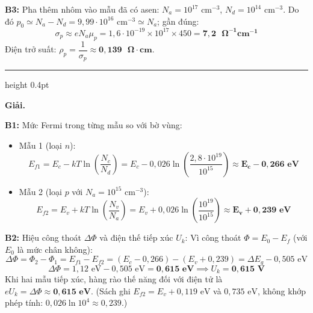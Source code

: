 \documentclass[11pt,a4paper]{article}
\renewcommand{\boldsymbol}[1]{\symbf{#1}}
\let\DeBaiOriginal\DeBai
\renewcommand{\DeBai}[1]{\par\Needspace{5\baselineskip}\DeBaiOriginal{#1}}
\newcommand{\PhanCachBai}{%
  \par\Needspace{7\baselineskip}%
  \addvspace{6pt}%
  {\color{black!40}\hrule height 0.4pt}%
  \nobreak\vspace{7pt}\nobreak
}
\begin{document}
\textbf{B3:} Pha thêm nhôm vào mẫu đã có asen: $N_a=10^{17}\text{ cm}^{-3}$, $N_d=10^{14}\text{ cm}^{-3}$. Do đó $p_0\simeq N_a-N_d=9{,}99\cdot10^{16}\text{ cm}^{-3}\simeq N_a$; gần đúng:
\begin{equation*}
    \sigma_p \approx e N_a \mu_p = 1{,}6 \cdot 10^{-19} \times 10^{17} \times 450 = \boldsymbol{7{,}2\text{ }\Omega^{-1}\text{cm}^{-1}}
\end{equation*}
Điện trở suất: $\rho_p = \dfrac{1}{\sigma_p} \approx \boldsymbol{0{,}139\text{ }\Omega\cdot\text{cm}}$.

\PhanCachBai


\textbf{Giải.}

\textbf{B1:} Mức Fermi trong từng mẫu so với bờ vùng:
\begin{itemize}[leftmargin=*, topsep=1pt, itemsep=1pt]
  \item Mẫu 1 (loại $n$):
  \begin{equation*}
      E_{f1} = E_c - kT \ln\left(\frac{N_c}{N_d}\right) = E_c - 0{,}026 \ln\left(\frac{2{,}8 \cdot 10^{19}}{10^{15}}\right) \approx \boldsymbol{E_c - 0{,}266\text{ eV}}
  \end{equation*}
  \item Mẫu 2 (loại $p$ với $N_a = 10^{15}\text{ cm}^{-3}$):
  \begin{equation*}
      E_{f2} = E_v + kT \ln\left(\frac{N_v}{N_a}\right) = E_v + 0{,}026 \ln\left(\frac{10^{19}}{10^{15}}\right) \approx \boldsymbol{E_v + 0{,}239\text{ eV}}
  \end{equation*}
\end{itemize}

\textbf{B2:} Hiệu công thoát $\Delta\Phi$ và điện thế tiếp xúc $U_k$:
Vì công thoát $\Phi = E_0 - E_f$ (với $E_0$ là mức chân không):
\begin{equation*}
    \Delta\Phi = \Phi_2 - \Phi_1 = E_{f1} - E_{f2} = (E_c - 0{,}266) - (E_v + 0{,}239) = \Delta E_g - 0{,}505\text{ eV}
\end{equation*}
\begin{equation*}
    \Delta\Phi = 1{,}12\text{ eV} - 0{,}505\text{ eV} = \boldsymbol{0{,}615\text{ eV}} \implies U_k = \boldsymbol{0{,}615\text{ V}}
\end{equation*}
Khi hai mẫu tiếp xúc, hàng rào thế năng đối với điện tử là $eU_k=\Delta\Phi\approx\boldsymbol{0{,}615\text{ eV}}$.
(Sách ghi $E_{f2}=E_v+0{,}119\text{ eV}$ và $0{,}735\text{ eV}$, không khớp phép tính: $0{,}026\ln10^4\approx0{,}239$.)
\end{document}
